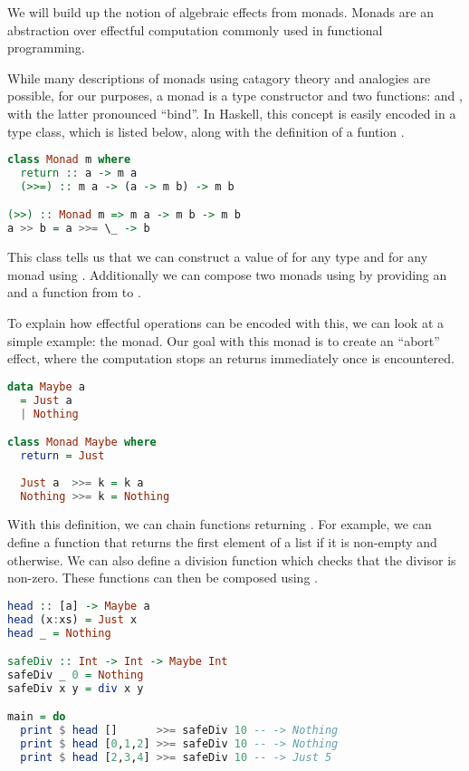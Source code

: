 We will build up the notion of algebraic effects from monads. Monads are an abstraction over effectful computation commonly used in functional programming.

While many descriptions of monads using catagory theory and analogies are possible, for our purposes, a monad is a type constructor  and two functions:  and \hs{>>=}, with the latter pronounced ``bind''. In Haskell, this concept is easily encoded in a type class, which is listed below, along with the definition of a funtion \hs{>>}.

\begin{lstlisting}[language=haskell,style=fancy]
class Monad m where
  return :: a -> m a
  (>>=) :: m a -> (a -> m b) -> m b

(>>) :: Monad m => m a -> m b -> m b
a >> b = a >>= \_ -> b
\end{lstlisting}

This class tells us that we can construct a value of  for any type  and for any monad  using . Additionally we can compose two monads using \hs{>>=} by providing an  and a function from  to .

To explain how effectful operations can be encoded with this, we can look at a simple example: the  monad. Our goal with this monad is to create an ``abort'' effect, where the computation stops an returns immediately once  is encountered.

\begin{lstlisting}[language=haskell,style=fancy]
data Maybe a
  = Just a
  | Nothing

class Monad Maybe where
  return = Just
  
  Just a  >>= k = k a
  Nothing >>= k = Nothing
\end{lstlisting}

With this definition, we can chain functions returning . For example, we can define a  function that returns the first element of a list if it is non-empty and  otherwise. We can also define a division function which checks that the divisor is non-zero. These functions can then be composed using \hs{>>=}.

\begin{lstlisting}[language=haskell,style=fancy]
head :: [a] -> Maybe a
head (x:xs) = Just x
head _ = Nothing

safeDiv :: Int -> Int -> Maybe Int
safeDiv _ 0 = Nothing
safeDiv x y = div x y

main = do
  print $ head []      >>= safeDiv 10 -- -> Nothing
  print $ head [0,1,2] >>= safeDiv 10 -- -> Nothing
  print $ head [2,3,4] >>= safeDiv 10 -- -> Just 5
\end{lstlisting}


